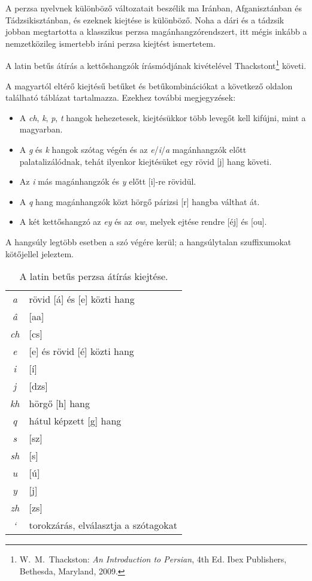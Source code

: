 A perzsa nyelvnek különböző változatait beszélik ma Iránban,
Afganisztánban és Tádzsikisztánban, és ezeknek kiejtése is
különböző. Noha a dári és a tádzsik jobban megtartotta a klasszikus perzsa
magánhangzórendszert, itt mégis inkább a nemzetközileg ismertebb iráni
perzsa kiejtést ismertetem.

A latin betűs átírás a kettőshangzók írásmódjának kivételével
Thackstont\footnote{W.~M.~Thackston: \emph{An Introduction to Persian},
4th Ed. Ibex Publishers, Bethesda, Maryland, 2009.} követi.

A magyartól eltérő kiejtésű betűket és betűkombinációkat a következő
oldalon található táblázat tartalmazza. Ezekhez további megjegyzések:

\begin{itemize}
  \item A \emph{ch}, \emph{k}, \emph{p}, \emph{t} hangok hehezetesek,
    kiejtésükkor több levegőt kell kifújni, mint a magyarban.
  \item A \emph{g} és \emph{k} hangok szótag végén és az
    \emph{e}/\emph{i}/\emph{a} magánhangzók előtt palatalizálódnak,
    tehát ilyenkor kiejtésüket egy rövid [j] hang követi.
  \item Az \emph{i} más magánhangzók és \emph{y} előtt [i]-re rövidül.
  \item A \emph{q} hang magánhangzók közt hörgő párizsi [r] hangba
    válthat át.
  \item A két kettőshangzó az \emph{ey} és az \emph{ow}, melyek ejtése
    rendre [éj] és [ou].
\end{itemize}

A hangsúly legtöbb esetben a szó végére kerül; a hangsúlytalan
szuffixumokat kötőjellel jeleztem.

\begin{table}[h]
  \begin{center}
    \smallskip\smallskip
    \begin{tabular}{cl}
      \emph{a} & rövid [á] és [e] közti hang\\
      \emph{â} & [aa]\\
      \emph{ch} & [cs]\\
      \emph{e} & [e] és rövid [é] közti hang\\
      \emph{i} & [í]\\
      \emph{j} & [dzs]\\
      \emph{kh} & hörgő [h] hang\\
      \emph{q} & hátul képzett [g] hang\\
      \emph{s} & [sz]\\
      \emph{sh} & [s]\\
      \emph{u} & [ú]\\
      \emph{y} & [j]\\
      \emph{zh} & [zs]\\
      \emph{`} & torokzárás, elválasztja a szótagokat\\
    \end{tabular}
  \end{center}
  \caption{A latin betűs perzsa átírás kiejtése.}
\end{table}
